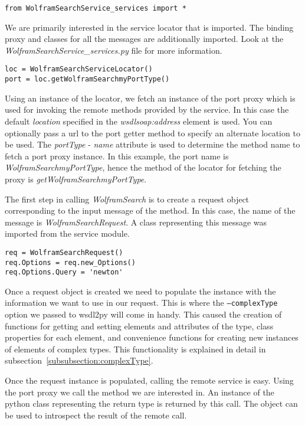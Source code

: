 \begin{verbatim}
from WolframSearchService_services import *
\end{verbatim}

We are primarily interested in the service locator that is imported.  The 
binding proxy and classes for all the messages are additionally imported.
Look at the {\it WolframSearchService_services.py} file for more information.

\begin{verbatim}
loc = WolframSearchServiceLocator()
port = loc.getWolframSearchmyPortType()
\end{verbatim}

Using an instance of the locator, we fetch an instance of the port proxy
which is used for invoking the remote methods provided by the service.  In
this case the default {\it location} specified in the {\it wsdlsoap:address}
element is used.  You can optionally pass a url to the port getter method to
specify an alternate location to be used.  The {\it portType} - {\it name} 
attribute is used to determine the method name to fetch a port proxy instance.
In this example, the port name is {\it WolframSearchmyPortType}, hence the 
method of the locator for fetching the proxy is {\it getWolframSearchmyPortType}.

The first step in calling {\it WolframSearch} is to create a request object
corresponding to the input message of the method.  In this case, the name of
the message is {\it WolframSearchRequest}.  A class representing this message
was imported from the service module.

\begin{verbatim}
req = WolframSearchRequest()
req.Options = req.new_Options()
req.Options.Query = 'newton'
\end{verbatim}

Once a request object is created we need to populate the instance with the
information we want to use in our request.  This is where the {\tt --complexType}
option we passed to wsdl2py will come in handy.  This caused the creation of 
functions for getting and setting elements and attributes of the type, class 
properties for each element, and convenience functions for creating new instances
of elements of complex types.  This functionality is explained in detail in 
subsection~\ref{subsubsection:complexType}.

Once the request instance is populated, calling the remote service is easy.  Using
the port proxy we call the method we are interested in.  An instance of the python
class representing the return type is returned by this call.  The  object
can be used to introspect the result of the remote call.

